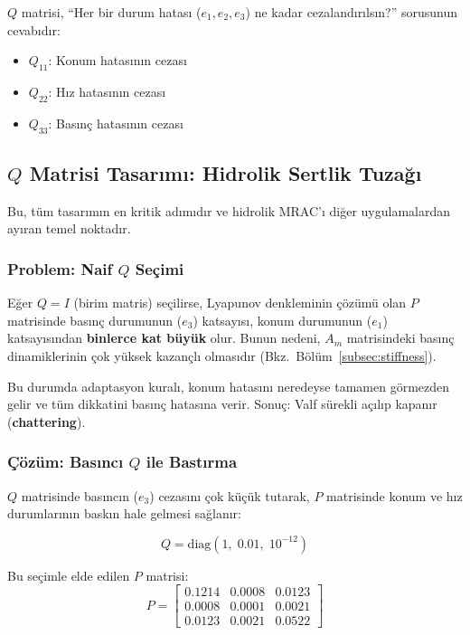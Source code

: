 \documentclass[12pt,a4paper]{article}
\begin{document}
\begin{kavram}
$Q$ matrisi, ``Her bir durum hatası ($e_1, e_2, e_3$) ne kadar cezalandırılsın?'' sorusunun cevabıdır:
\begin{itemize}
    \item $Q_{11}$: Konum hatasının cezası
    \item $Q_{22}$: Hız hatasının cezası
    \item $Q_{33}$: Basınç hatasının cezası
\end{itemize}
\end{kavram}

\subsection{$Q$ Matrisi Tasarımı: Hidrolik Sertlik Tuzağı}
\label{subsec:Q_design}

Bu, tüm tasarımın en kritik adımıdır ve hidrolik MRAC'ı diğer uygulamalardan ayıran temel noktadır.

\subsubsection{Problem: Naif $Q$ Seçimi}
Eğer $Q = I$ (birim matris) seçilirse, Lyapunov denkleminin çözümü olan $P$ matrisinde basınç durumunun ($e_3$) katsayısı, konum durumunun ($e_1$) katsayısından \textbf{binlerce kat büyük} olur. Bunun nedeni, $A_m$ matrisindeki basınç dinamiklerinin çok yüksek kazançlı olmasıdır (Bkz.\ B\"ol\"um~\ref{subsec:stiffness}).

Bu durumda adaptasyon kuralı, konum hatasını neredeyse tamamen görmezden gelir ve tüm dikkatini basınç hatasına verir. Sonuç: Valf sürekli açılıp kapanır (\textbf{chattering}).

\subsubsection{Çözüm: Basıncı $Q$ ile Bastırma}
\label{subsubsec:Q_solution}

$Q$ matrisinde basıncın ($e_3$) cezasını çok küçük tutarak, $P$ matrisinde konum ve hız durumlarının baskın hale gelmesi sağlanır:

\begin{equation}
    \boxed{Q = \text{diag}\left(1,\; 0.01,\; 10^{-12}\right)}
    \label{eq:Q_final}
\end{equation}

Bu seçimle elde edilen $P$ matrisi:
\begin{equation}
    P = \begin{bmatrix}
        0.1214 & 0.0008 & 0.0123 \\
        0.0008 & 0.0001 & 0.0021 \\
        0.0123 & 0.0021 & 0.0522
    \end{bmatrix}
\end{equation}
\end{document}
